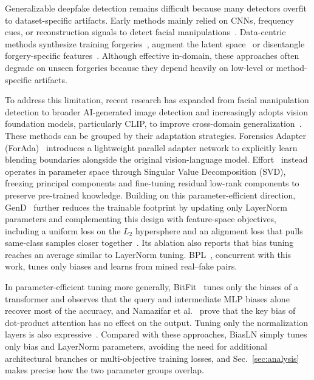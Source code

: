 \documentclass[fonts]{icst}
\newif\ifrevmark\revmarkfalse
\newcommand{\rev}[1]{\ifrevmark{\color{revblue}#1}\else#1\fi}
\begin{document}
Generalizable deepfake detection remains difficult because many detectors overfit to dataset-specific artifacts. Early methods mainly relied on CNNs, frequency cues, or reconstruction signals to detect facial manipulations~\cite{rossler2019ff,qian2020frequency,luo2021srm,liu2021spsl,cao2022recce,badr2025wavit}. \rev{Data-centric methods synthesize training forgeries~\cite{shiohara2022sbi,chen2022sladd,lin2024cdfa}, augment the latent space~\cite{yan2024latent} or disentangle forgery-specific features~\cite{yan2023ucf,huang2023iid}.} Although effective in-domain, these approaches often degrade on unseen forgeries because they depend heavily on low-level or method-specific artifacts.

To address this limitation, recent research has expanded from facial manipulation detection to broader AI-generated image detection and increasingly adopts vision foundation models, particularly CLIP, to improve cross-domain generalization~\cite{ojha2023universal,cui2025forada,yan2025effort,yermakov2025gend}. These methods can be grouped by their adaptation strategies. \rev{Forensics Adapter (ForAda)}~\cite{cui2025forada} introduces a lightweight parallel adapter network to explicitly learn blending boundaries alongside the original vision-language model. Effort~\cite{yan2025effort} instead operates in parameter space through Singular Value Decomposition (SVD), freezing principal components and fine-tuning residual low-rank components to preserve pre-trained knowledge. Building on this parameter-efficient direction, GenD~\cite{yermakov2025gend} further reduces the trainable footprint by updating only LayerNorm parameters and complementing this design with feature-space objectives, including a uniform loss on the $L_2$ hypersphere and an alignment loss that pulls same-class samples closer together\rev{~\cite{wang2020alignment}. Its ablation also reports that bias tuning reaches an average similar to LayerNorm tuning. BPL~\cite{xu2026bpl}, concurrent with this work, tunes only biases and learns from mined real--fake pairs.}

\rev{In parameter-efficient tuning more generally, BitFit~\cite{benzaken2022bitfit} tunes only the biases of a transformer and observes that the query and intermediate MLP biases alone recover most of the accuracy, and Namazifar et al.~\cite{namazifar2023bias} prove that the key bias of dot-product attention has no effect on the output. Tuning only the normalization layers is also expressive~\cite{giannou2023layernorm,wang2022ln,valizadeh2024layernorm}.}
Compared with these approaches, BiasLN simply tunes only bias and LayerNorm parameters, avoiding the need for additional architectural branches or multi-objective training losses\rev{, and Sec.~\ref{sec:analysis} makes precise how the two parameter groups overlap.}
\end{document}
